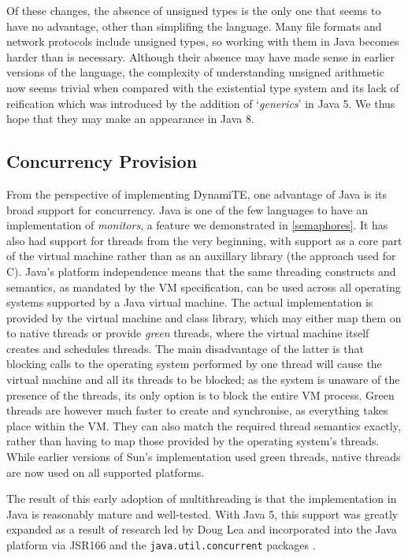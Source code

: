 Of these changes, the absence of unsigned types is the only one that
seems to have no advantage, other than simplifing the language.  Many
file formats and network protocols include unsigned types, so working
with them in Java becomes harder than is necessary.  Although their
absence may have made sense in earlier versions of the language, the
complexity of understanding unsigned arithmetic now seems trivial when
compared with the existential type system and its lack of reification
which was introduced by the addition of `\emph{generics}' in Java 5.
We thus hope that they may make an appearance in Java 8.

\subsection{Concurrency Provision}

From the perspective of implementing DynamiTE, one advantage of Java
is its broad support for concurrency.  Java is one of the few
languages to have an implementation of \emph{monitors}, a feature we
demonstrated in \ref{semaphores}.  It has also had support for threads
from the very beginning, with support as a core part of the virtual
machine rather than as an auxillary library (the approach used for C).
Java's platform independence means that the same threading constructs
and semantics, as mandated by the VM specification\cite{vmspec}, can
be used across all operating systems supported by a Java virtual
machine.  The actual implementation is provided by the virtual machine
and class library, which may either map them on to native threads or
provide \emph{green} threads, where the virtual machine itself creates
and schedules threads.  The main disadvantage of the latter is that
blocking calls to the operating system performed by one thread will
cause the virtual machine and all its threads to be blocked; as the
system is unaware of the presence of the threads, its only option is
to block the entire VM process.  Green threads are however much faster
to create and synchronise, as everything takes place within the VM.
They can also match the required thread semantics exactly, rather than
having to map those provided by the operating system's threads.  While
earlier versions of Sun's implementation used green threads, native
threads are now used on all supported platforms.

The result of this early adoption of multithreading is that the
implementation in Java is reasonably mature and well-tested.  With
Java 5, this support was greatly expanded as a result of research \cite{aqs} led
by Doug Lea and incorporated into the Java platform via JSR166 and the
\texttt{java.util.concurrent} packages \cite{jsr166, concpractice}.

